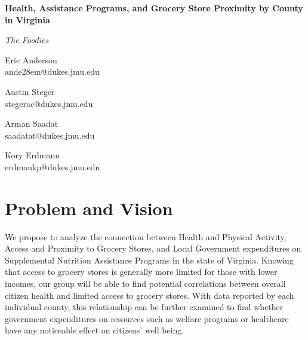 \documentclass[11pt]{article}
\begin{document}

\begin{center}
\bfseries\huge
Health, Assistance Programs, and Grocery Store Proximity by County in Virginia
\end{center}

\begin{center}
\itshape\large
The Foodies
\end{center}

\begin{multicols}{4}
\centering

Eric Anderson \\
{\footnotesize ande28em@dukes.jmu.edu}

Austin Steger \\
{\footnotesize stegerac@dukes.jmu.edu}

Arman Saadat \\ 
{\footnotesize saadatat@dukes.jmu.edu}

Kory Erdmann \\
{\footnotesize erdmankp@dukes.jmu.edu}

\end{multicols}


\section*{Problem and Vision}
We propose to analyze the connection between Health and Physical Activity, Access and Proximity to Grocery Stores, and Local Government expenditures on Supplemental Nutrition Assistance Programs in the state of Virginia. Knowing that access to grocery stores is generally more limited for those with lower incomes, our group will be able to find potential correlations between overall citizen health and limited access to grocery stores. With data reported by each individual county, this relationship can be further examined to find whether government expenditures on resources such as welfare programs or healthcare have any noticeable effect on citizens' well being.
\end{document}
